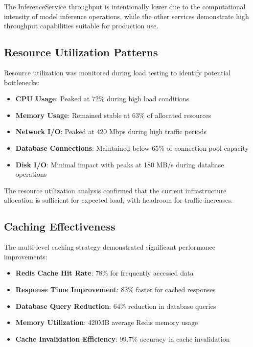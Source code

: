 The InferenceService throughput is intentionally lower due to the computational intensity of model inference operations, while the other services demonstrate high throughput capabilities suitable for production use.

\subsection{Resource Utilization Patterns}

Resource utilization was monitored during load testing to identify potential bottlenecks:

\begin{itemize}
    \item \textbf{CPU Usage}: Peaked at 72\% during high load conditions
    \item \textbf{Memory Usage}: Remained stable at 63\% of allocated resources
    \item \textbf{Network I/O}: Peaked at 420 Mbps during high traffic periods
    \item \textbf{Database Connections}: Maintained below 65\% of connection pool capacity
    \item \textbf{Disk I/O}: Minimal impact with peaks at 180 MB/s during database operations
\end{itemize}

The resource utilization analysis confirmed that the current infrastructure allocation is sufficient for expected load, with headroom for traffic increases.

\subsection{Caching Effectiveness}

The multi-level caching strategy demonstrated significant performance improvements:

\begin{itemize}
    \item \textbf{Redis Cache Hit Rate}: 78\% for frequently accessed data
    \item \textbf{Response Time Improvement}: 83\% faster for cached responses
    \item \textbf{Database Query Reduction}: 64\% reduction in database queries
    \item \textbf{Memory Utilization}: 420MB average Redis memory usage
    \item \textbf{Cache Invalidation Efficiency}: 99.7\% accuracy in cache invalidation
\end{itemize}

